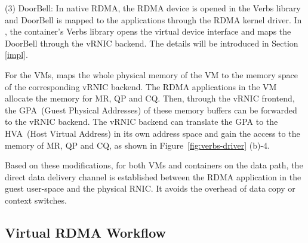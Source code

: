 
(3) DoorBell: In native RDMA, the RDMA device is opened in the Verbs library and DoorBell is mapped to the applications through the RDMA kernel driver.
In \sys, the container's Verbs library opens the virtual device interface and maps the DoorBell through the vRNIC backend. The details will be introduced in Section \ref{impl}.


For the VMs, \sys maps the whole physical memory of the VM to the memory space of the corresponding vRNIC backend.
The RDMA applications in the VM allocate the memory for MR, QP and CQ. Then, through the vRNIC frontend, the GPA~(Guest Physical Addresses) of these memory buffers can be forwarded to the vRNIC backend. The vRNIC backend can translate the GPA to the HVA~(Host Virtual Address) in its own address space and gain the access to the memory of MR, QP and CQ, as shown in Figure~\ref{fig:verbs-driver} (b)-4.


Based on these modifications, for both VMs and containers on the data path, the direct data delivery channel is established between the RDMA application in the guest user-space and the physical RNIC. It avoids the overhead of data copy or context switches.

\subsection{Virtual RDMA Workflow}


